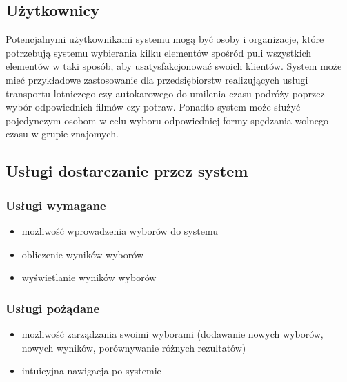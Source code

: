 \documentclass[polish,11pt]{aghthesis}
\begin{document}

\subsection{Użytkownicy}
Potencjalnymi użytkownikami systemu mogą być osoby i organizacje, które potrzebują
systemu wybierania kilku elementów spośród puli wszystkich elementów w taki sposób, aby
usatysfakcjonować swoich klientów. System może mieć przykładowe zastosowanie dla
przedsiębiorstw realizujących usługi transportu lotniczego czy autokarowego do umilenia
czasu podróży poprzez wybór odpowiednich filmów czy potraw. Ponadto system może
służyć pojedynczym osobom w celu wyboru odpowiedniej formy spędzania wolnego czasu w
grupie znajomych.


\subsection{Usługi dostarczanie przez system}

\subsubsection{Usługi wymagane}
\begin{itemize}
    \item możliwość wprowadzenia wyborów do systemu
    \item obliczenie wyników wyborów
    \item wyświetlanie wyników wyborów
\end{itemize}

\subsubsection{Usługi pożądane}
\begin{itemize}
    \item możliwość zarządzania swoimi wyborami (dodawanie nowych wyborów, nowych wyników, porównywanie różnych rezultatów)
    \item intuicyjna nawigacja po systemie
\end{itemize}
\end{document}
